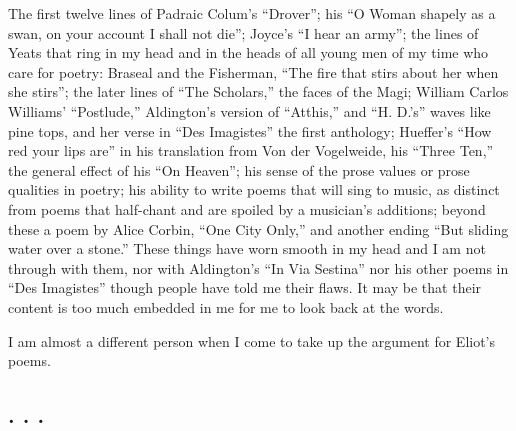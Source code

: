 The first twelve lines of Padraic Colum's ``Drover''; his ``O Woman
shapely as a swan, on your account I shall not die''; Joyce's ``I hear
an army''; the lines of Yeats that ring in my head and in the heads of
all young men of my time who care for poetry: Braseal and the Fisherman,
``The fire that stirs about her when she stirs''; the later lines of
``The Scholars,'' the faces of the Magi; William Carlos Williams'
``Postlude,'' Aldington's version of ``Atthis,'' and ``H. D.'s'' waves
like pine tops, and her verse in ``Des Imagistes'' the first anthology;
Hueffer's ``How red your lips are'' in his translation from Von der
Vogelweide, his ``Three Ten,'' the general effect of his ``On Heaven'';
his sense of the prose values or prose qualities in poetry; his ability
to write poems that will sing to music, as distinct from poems that
half-chant and are spoiled by a musician's additions; beyond these a
poem by Alice Corbin, ``One City Only,'' and another ending ``But
sliding water over a stone.'' These things have worn smooth in my head
and I am not through with them, nor with Aldington's ``In Via Sestina''
nor his other poems in ``Des Imagistes'' though people have told me
their flaws. It may be that their content is too much embedded in me for
me to look back at the words.

I am almost a different person when I come to take up the argument for
Eliot's poems.

\subsection{. . .}\label{section-4}

